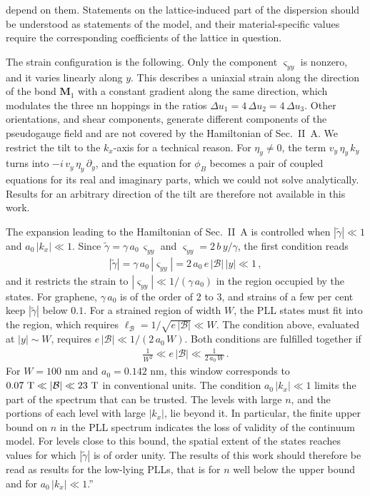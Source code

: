 \documentclass[aps,prb,onecolumn,nofootinbib,citeautoscript,10pt]{revtex4-2}
\DeclareRobustCommand{\bs}[1]{\bm{#1}}
\begin{document}
\begin{enumerate}
depend on them. Statements on the lattice-induced part of the dispersion should be understood as statements of the model, and their material-specific values require the corresponding coefficients of the lattice in question.

The strain configuration is the following. Only the component $\varsigma_{yy}$ is nonzero, and it varies linearly along $y$. This describes a uniaxial strain along the direction of the bond $\bs M_1$ with a constant gradient along the same direction, which modulates the three nn hoppings in the ratios $\Delta u_1=4\,\Delta u_2=4\,\Delta u_3$. Other orientations, and shear components, generate different components of the pseudogauge field and are not covered by the Hamiltonian of Sec.~II~A. We restrict the tilt to the $k_x$-axis for a technical reason. For $\eta_y\neq0$, the term $v_y\,\eta_y\,k_y$ turns into $-i\,v_y\,\eta_y\,\partial_y$, and the equation for $\phi_B$ becomes a pair of coupled equations for its real and imaginary parts, which we could not solve analytically. Results for an arbitrary direction of the tilt are therefore not available in this work.

The expansion leading to the Hamiltonian of Sec.~II~A is controlled when $|\tilde\gamma|\ll1$ and $a_0\,|k_x|\ll1$. Since $\tilde\gamma=\gamma\,a_0\,\varsigma_{yy}$ and $\varsigma_{yy}=2\,b\,y/\gamma$, the first condition reads
\begin{align}
|\tilde\gamma|=\gamma\,a_0\,|\varsigma_{yy}|=2\,a_0\,e\,|\mathcal B|\,|y|\ll1\,,
\end{align}
and it restricts the strain to $|\varsigma_{yy}|\ll1/(\gamma\,a_0)$ in the region occupied by the states. For graphene, $\gamma\,a_0$ is of the order of 2 to 3, and strains of a few per cent keep $|\tilde\gamma|$ below $0.1$. For a strained region of width $W$, the PLL states must fit into the region, which requires $\ell_{\mathcal B}=1/\sqrt{e\,|\mathcal B|}\ll W$. The condition above, evaluated at $|y|\sim W$, requires $e\,|\mathcal B|\ll1/(2\,a_0\,W)$. Both conditions are fulfilled together if
\begin{align}
\frac{1}{W^2}\ll e\,|\mathcal B|\ll\frac{1}{2\,a_0\,W}\,.
\end{align}
For $W=100$ nm and $a_0=0.142$ nm, this window corresponds to $0.07\ {\rm T}\ll|\mathcal B|\ll23\ {\rm T}$ in conventional units. The condition $a_0\,|k_x|\ll1$ limits the part of the spectrum that can be trusted. The levels with large $n$, and the portions of each level with large $|k_x|$, lie beyond it. In particular, the finite upper bound on $n$ in the PLL spectrum indicates the loss of validity of the continuum model. For levels close to this bound, the spatial extent of the states reaches values for which $|\tilde\gamma|$ is of order unity. The results of this work should therefore be read as results for the low-lying PLLs, that is for $n$ well below the upper bound and for $a_0\,|k_x|\ll1$.''


\end{enumerate}
\end{document}
